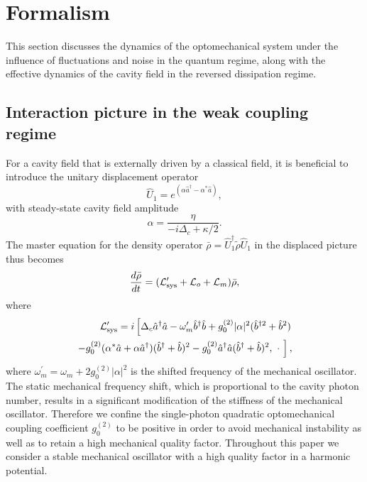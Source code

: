 \documentclass[pra,aps,showpacs,twocolumn,floatfix, superscriptaddress, nofootinbib, nobibnotes]{revtex4-1}
\begin{document}
\section{Formalism}
\label{sec:Formalism}
This section discusses the dynamics of the optomechanical system under the influence of fluctuations and noise in the quantum regime, along with the effective dynamics of the cavity field in the reversed dissipation regime.

\subsection{Interaction picture in the weak coupling regime}
For a cavity field that is externally driven by a classical field, it is beneficial to introduce the unitary displacement operator 
\begin{equation}
\hat U_1 =e^{(\alpha\hat a^\dag -\alpha^* \hat a)},
\end{equation}
with steady-state cavity field amplitude
\begin{equation}
\alpha=\frac{\eta}{-i\Delta_c+\kappa/2}.
\label{eq:Lorentzian}
\end{equation}
The master equation for the density operator $\bar\rho =  \hat U_1^\dag   \tilde\rho\hat U_1$ in the displaced picture thus becomes
\begin{eqnarray}
\frac{d\bar \rho}{dt} =({\cal L}_{\rm sys}' +{\cal L}_o+{\cal L}_m)\bar\rho, 
\end{eqnarray}
where
\begin{equation}
\begin{aligned}
 {\cal L}_{\rm sys}' =   i\left[\Delta_c\hat a^\dag\hat a-\omega_m'\hat b^\dag\hat b+g_0^{(2)}|\alpha|^2(\hat b^{\dag 2}+\hat b^2) \right. \\
\left.  -g_0^{(2)}(\alpha^*\hat a+\alpha\hat a^\dag)(\hat b^{\dag}+\hat b)^2-g_0^{(2)}\hat a^\dag\hat a(\hat b^{\dag}+\hat b)^2,~\cdot~\right],
\end{aligned}
\end{equation}
where $\omega_m^\prime = \omega_m + 2g_0^{(2)}|\alpha|^2$ is the shifted frequency of the mechanical oscillator. The static mechanical frequency shift, which is proportional to the cavity photon number, results in a significant modification of the stiffness of the mechanical oscillator. Therefore we confine the single-photon quadratic optomechanical coupling coefficient $g_0^{(2)}$ to be positive in order to avoid mechanical instability as well as to retain a high mechanical quality factor. Throughout this paper we consider a stable mechanical oscillator with a high quality factor in a harmonic potential.  
\end{document}
